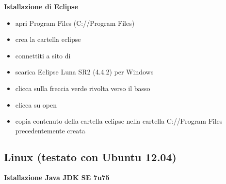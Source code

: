 \documentclass{article}
\begin{document}
\textbf{Istallazione di Eclipse}
\begin{itemize}
\item apri Program Files (C://Program Files)
\item crea la cartella eclipse
\item connettiti a sito di \href{https://eclipse.org/downloads/}{}
\item scarica Eclipse Luna SR2 (4.4.2) per Windows
\item clicca sulla freccia verde rivolta verso il basso
\item clicca su open
\item copia contenuto della cartella eclipse nella cartella C://Program Files precedentemente creata
\end{itemize}

\subsection{Linux (testato con Ubuntu 12.04)}
\textbf{Istallazione Java JDK SE 7u75}
\end{document}
